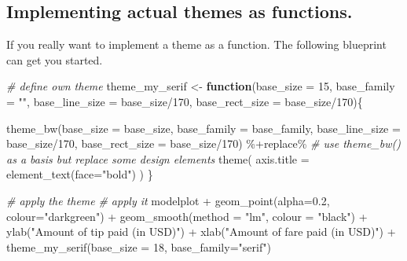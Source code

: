 \documentclass[
  12pt,
]{style/krantz}
\newenvironment{Shaded}{\begin{snugshade}}{\end{snugshade}}
\newcommand{\AttributeTok}[1]{\textcolor[rgb]{0.77,0.63,0.00}{#1}}
\newcommand{\CommentTok}[1]{\textcolor[rgb]{0.56,0.35,0.01}{\textit{#1}}}
\newcommand{\ControlFlowTok}[1]{\textcolor[rgb]{0.13,0.29,0.53}{\textbf{#1}}}
\newcommand{\DecValTok}[1]{\textcolor[rgb]{0.00,0.00,0.81}{#1}}
\newcommand{\FloatTok}[1]{\textcolor[rgb]{0.00,0.00,0.81}{#1}}
\newcommand{\FunctionTok}[1]{\textcolor[rgb]{0.00,0.00,0.00}{#1}}
\newcommand{\NormalTok}[1]{#1}
\newcommand{\OtherTok}[1]{\textcolor[rgb]{0.56,0.35,0.01}{#1}}
\newcommand{\SpecialCharTok}[1]{\textcolor[rgb]{0.00,0.00,0.00}{#1}}
\newcommand{\StringTok}[1]{\textcolor[rgb]{0.31,0.60,0.02}{#1}}
\begin{document}
\hypertarget{implementing-actual-themes-as-functions.}{%
\subsection{Implementing actual themes as functions.}\label{implementing-actual-themes-as-functions.}}

If you really want to implement a theme as a function. The following blueprint can get you started.

\begin{Shaded}
\begin{Highlighting}[]
\CommentTok{\# define own theme}
\NormalTok{theme\_my\_serif }\OtherTok{\textless{}{-}} 
  \ControlFlowTok{function}\NormalTok{(}\AttributeTok{base\_size =} \DecValTok{15}\NormalTok{,}
           \AttributeTok{base\_family =} \StringTok{""}\NormalTok{,}
           \AttributeTok{base\_line\_size =}\NormalTok{ base\_size}\SpecialCharTok{/}\DecValTok{170}\NormalTok{,}
           \AttributeTok{base\_rect\_size =}\NormalTok{ base\_size}\SpecialCharTok{/}\DecValTok{170}\NormalTok{)\{ }
    
    \FunctionTok{theme\_bw}\NormalTok{(}\AttributeTok{base\_size =}\NormalTok{ base\_size,}
             \AttributeTok{base\_family =}\NormalTok{ base\_family,}
             \AttributeTok{base\_line\_size =}\NormalTok{ base\_size}\SpecialCharTok{/}\DecValTok{170}\NormalTok{,}
             \AttributeTok{base\_rect\_size =}\NormalTok{ base\_size}\SpecialCharTok{/}\DecValTok{170}\NormalTok{) }\SpecialCharTok{\%+replace\%}    \CommentTok{\# use theme\_bw() as a basis but replace some design elements}
    \FunctionTok{theme}\NormalTok{(}
      \AttributeTok{axis.title =} \FunctionTok{element\_text}\NormalTok{(}\AttributeTok{face=}\StringTok{"bold"}\NormalTok{)}
\NormalTok{    )}
\NormalTok{  \}}

\CommentTok{\# apply the theme}
\CommentTok{\# apply it }
\NormalTok{modelplot }\SpecialCharTok{+}
     \FunctionTok{geom\_point}\NormalTok{(}\AttributeTok{alpha=}\FloatTok{0.2}\NormalTok{, }\AttributeTok{colour=}\StringTok{"darkgreen"}\NormalTok{) }\SpecialCharTok{+}
     \FunctionTok{geom\_smooth}\NormalTok{(}\AttributeTok{method =} \StringTok{"lm"}\NormalTok{, }\AttributeTok{colour =} \StringTok{"black"}\NormalTok{) }\SpecialCharTok{+}
     \FunctionTok{ylab}\NormalTok{(}\StringTok{"Amount of tip paid (in USD)"}\NormalTok{) }\SpecialCharTok{+}
     \FunctionTok{xlab}\NormalTok{(}\StringTok{"Amount of fare paid (in USD)"}\NormalTok{) }\SpecialCharTok{+}
  \FunctionTok{theme\_my\_serif}\NormalTok{(}\AttributeTok{base\_size =} \DecValTok{18}\NormalTok{, }\AttributeTok{base\_family=}\StringTok{"serif"}\NormalTok{)}
\end{Highlighting}
\end{Shaded}
\end{document}
